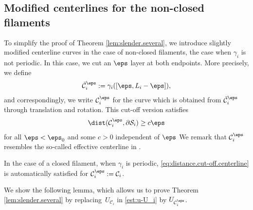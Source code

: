 \subsection{Modified centerlines for the non-closed filaments}
\label{sec:non-closed}

To simplify the proof of Theorem \ref{lem:slender.several},
we introduce slightly modified centerline curves in the case of non-closed filaments, \ie the case when $\gamma_i$ is not periodic. In this case, we cut an $\eps$ layer at both endpoints. More precisely, we define
\begin{equation}
\bar {\mathcal C}_i^\eps := \gamma_i([\eps,L_i - \eps]),
\end{equation}
and correspondingly, we write $\mathcal C_i^\eps$ for the curve which is obtained from $\bar {\mathcal C}_i^\eps$ through translation and rotation.
This cut-off version satisfies
\begin{equation} \label{eq:distance.cut-off.centerline}
\dist(\mathcal C_i^\eps,\partial \mathcal S_i) \geq c \eps
\end{equation}
for all $\eps < \eps_0$ and some $c > 0$ independent of $\eps$
We remark that $\mathcal C_i^\eps$ resembles the so-called effective centerline in \cite{Mori-Ohm-free-ends}.

In the case of a closed filament, \ie when $\gamma_i$ is periodic, \eqref{eq:distance.cut-off.centerline} is automatically satisfied for $\mathcal C_i^\eps := \mathcal C_i$.

We show the following lemma, which allows us to prove Theorem \ref{lem:slender.several} by replacing~$U_{\mathcal C_i}$ in \eqref{est:u-U_i} by
$U_{\mathcal C_i^\eps}$.

